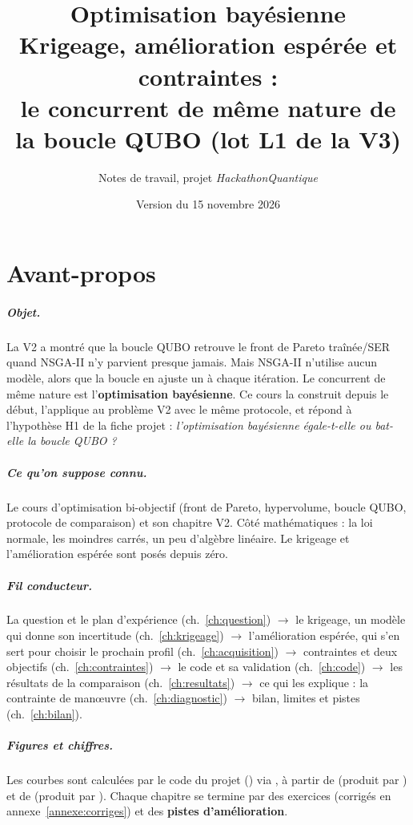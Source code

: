 \documentclass[11pt,a4paper]{report}
\title{\textbf{Optimisation bayésienne}\\[0.4em]\large Krigeage, amélioration espérée et contraintes :\\ le concurrent de même nature de la boucle QUBO (lot L1 de la V3)}
\author{Notes de travail, projet \emph{HackathonQuantique}}
\date{Version du 15 novembre 2026}
\begin{document}
\maketitle
{}

\chapter*{Avant-propos}
\paragraph{Objet.} La V2 a montré que la boucle QUBO retrouve le front de Pareto traînée/SER quand NSGA-II n'y parvient presque jamais. Mais NSGA-II n'utilise aucun modèle, alors que la boucle en ajuste un à chaque itération. Le concurrent de même nature est l'\textbf{optimisation bayésienne}. Ce cours la construit depuis le début, l'applique au problème V2 avec le même protocole, et répond à l'hypothèse H1 de la fiche projet : \emph{l'optimisation bayésienne égale-t-elle ou bat-elle la boucle QUBO ?}

\paragraph{Ce qu'on suppose connu.} Le cours d'optimisation bi-objectif (front de Pareto, hypervolume, boucle QUBO, protocole de comparaison) et son chapitre V2. Côté mathématiques : la loi normale, les moindres carrés, un peu d'algèbre linéaire. Le krigeage et l'amélioration espérée sont posés depuis zéro.

\paragraph{Fil conducteur.} La question et le plan d'expérience (ch.~\ref{ch:question}) $\to$ le krigeage, un modèle qui donne son incertitude (ch.~\ref{ch:krigeage}) $\to$ l'amélioration espérée, qui s'en sert pour choisir le prochain profil (ch.~\ref{ch:acquisition}) $\to$ contraintes et deux objectifs (ch.~\ref{ch:contraintes}) $\to$ le code et sa validation (ch.~\ref{ch:code}) $\to$ les résultats de la comparaison (ch.~\ref{ch:resultats}) $\to$ ce qui les explique : la contrainte de manœuvre (ch.~\ref{ch:diagnostic}) $\to$ bilan, limites et pistes (ch.~\ref{ch:bilan}).

\paragraph{Figures et chiffres.} Les courbes sont calculées par le code du projet () via , à partir de  (produit par ) et de  (produit par ). Chaque chapitre se termine par des exercices (corrigés en annexe~\ref{annexe:corriges}) et des \textbf{pistes d'amélioration}.
\end{document}

